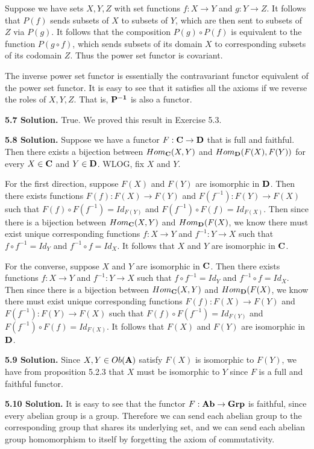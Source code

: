 Suppose we have sets $X, Y, Z$ with set functions $f: X \to Y$ and $g: Y \to Z$. It follows that $P(f)$ sends subsets of $X$ to subsets of $Y$, which are then sent to subsets of $Z$ via $P(g)$. It follows that the composition $P(g) \circ P(f)$ is equivalent to the function $P(g \circ f)$, which sends subsets of its domain $X$ to corresponding subsets of its codomain $Z$. Thus the power set functor is covariant.

The inverse power set functor is essentially the contravariant functor equivalent of the power set functor. It is easy to see that it satisfies all the axioms if we reverse the roles of $X, Y, Z$. That is, $\bf{P^{-1}}$ is also a functor.

\textbf{5.7 Solution.} True. We proved this result in Exercise 5.3.

\textbf{5.8 Solution.} Suppose we have a functor $F: \bf{C} \to \bf{D}$ that is full and faithful. Then there exists a bijection between $Hom_{\bf{C}}(X, Y)$ and $Hom_{\bf{D}}(F(X), F(Y))$ for every $X \in \bf{C}$ and $Y \in \bf{D}$. WLOG, fix $X$ and $Y$.

For the first direction, suppose $F(X)$ and $F(Y)$ are isomorphic in $\bf{D}$. Then there exists functions $F(f): F(X) \to F(Y)$ and $F(f^{-1}): F(Y) \to F(X)$ such that $F(f) \circ F(f^{-1}) = Id_{F(Y)}$ and $F(f^{-1}) \circ F(f) = Id_{F(X)}$. Then since there is a bijection between $Hom_{\bf{C}}(X, Y)$ and $Hom_{\bf{D}}(F(X)$, we know there must exist unique corresponding functions $f: X \to Y$ and $f^{-1}: Y \to X$ such that $f \circ f^{-1} = Id_Y$ and $f^{-1} \circ f = Id_X$. It follows that $X$ and $Y$ are isomorphic in $\bf{C}$.

For the converse, suppose $X$ and $Y$ are isomorphic in $\bf{C}$. Then there exists functions $f: X \to Y$ and $f^{-1}: Y \to X$ such that $f \circ f^{-1} = Id_Y$ and $f^{-1} \circ f = Id_X$. Then since there is a bijection between $Hom_{\bf{C}}(X, Y)$ and $Hom_{\bf{D}}(F(X)$, we know there must exist unique corresponding functions $F(f): F(X) \to F(Y)$ and $F(f^{-1}): F(Y) \to F(X)$ such that $F(f) \circ F(f^{-1}) = Id_{F(Y)}$ and $F(f^{-1}) \circ F(f) = Id_{F(X)}$. It follows that $F(X)$ and $F(Y)$ are isomorphic in $\bf{D}$.

\textbf{5.9 Solution.} Since $X, Y \in Ob(\bf{A})$ satisfy $F(X)$ is isomorphic to $F(Y)$, we have from proposition 5.2.3 that $X$ must be isomorphic to $Y$ since $F$ is a full and faithful functor.

\textbf{5.10 Solution.} %
It is easy to see that the functor $F: \bf{Ab} \to \bf{Grp}$ is faithful, since every abelian group is a group. Therefore we can send each abelian group to the corresponding group that shares its underlying set, and we can send each abelian group homomorphism to itself by forgetting the axiom of commutativity.

